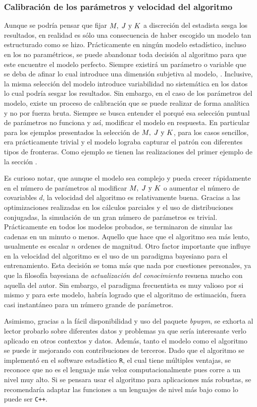 \documentclass[../Main/Main.tex]{subfiles}
\begin{document}
\subsubsection*{Calibración de los parámetros y velocidad del algoritmo}
Aunque se podría pensar que fijar $M,\;J\text{ y }K$ a discreción del estadista sesga los resultados, en realidad es sólo una consecuencia de haber escogido un modelo tan estructurado como se hizo. Prácticamente en ningún modelo estadístico, incluso en los no paramétricos, se puede abandonar toda decisión al algoritmo para que este encuentre el modelo perfecto. Siempre existirá un parámetro o variable que se deba de afinar lo cual introduce una dimensión subjetiva al modelo, \citet{wasserman2007all}. Inclusive, la misma selección del modelo introduce variabilidad no sistemática en los datos lo cual podría sesgar los resultados. Sin embargo, en el caso de los parámetros del modelo, existe un proceso de calibración que se puede realizar de forma analítica y no por fuerza bruta. Siempre se busca entender el porqué esa selección puntual de parámetros no funciona y así, modificar el modelo en respuesta. En particular para los ejemplos presentados la selección de $M,\;J\text{ y }K$, para los casos sencillos, era prácticamente trivial y el modelo lograba capturar el patrón con diferentes tipos de fronteras. Como ejemplo se tienen las realizaciones del primer ejemplo de la sección \pageref{sec:T1}.

Es curioso notar, que aunque el modelo sea complejo y pueda crecer rápidamente en el número de parámetros al modificar $M,\;J\text{ y }K$ o aumentar el número de covariables $d$, la velocidad del algoritmo es relativamente buena. Gracias a las optimizaciones realizadas en los cálculos parciales y el uso de distribuciones conjugadas, la simulación de un gran número de parámetros es trivial. Prácticamente en todos los modelos probados, se terminaron de simular las cadenas en un minuto o menos. Aquello que hace que el algoritmo sea más lento, usualmente es escalar $n$ ordenes de magnitud. Otro factor importante que influye en la velocidad del algoritmo es el uso de un paradigma bayesiano para el entrenamiento. Esta decisión se toma más que nada por cuestiones personales, ya que la filosofía bayesiana de \textit{actualización del conocimiento} resuena mucho con aquella del autor. Sin embargo, el paradigma frecuentista es muy valioso por si mismo y para este modelo, habría logrado que el algoritmo de estimación, fuera casi instantáneo para un número grande de parámetros.

Asimismo, gracias a la fácil disponibilidad y uso del paquete \textit{bpwpm}, se exhorta al lector probarlo sobre diferentes datos y problemas ya que sería interesante verlo aplicado en otros contextos y datos. Además, tanto el modelo como el algoritmo se puede ir mejorando con contribuciones de terceros. Dado que el algoritmo se implementó en el software estadístico \verb|R|, el cual tiene múltiples ventajas, se reconoce que no es el lenguaje más veloz computacionalmente pues corre a un nivel muy alto. Si se pensara usar el algoritmo para aplicaciones más robustas, se recomendaría adaptar las funciones a un lenguajes de nivel más bajo como lo puede ser \verb|C++|.
\end{document}
